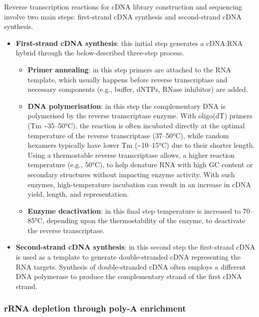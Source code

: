\documentclass[
]{book}
\begin{document}
Reverse transcription reactions for cDNA library construction and sequencing involve two main steps: first-strand cDNA synthesis and second-strand cDNA synthesis.

\begin{itemize}
\item
  \textbf{First-strand cDNA synthesis}: this initial step generates a cDNA:RNA hybrid through the below-described three-step process.

  \begin{itemize}
  \item
    \textbf{Primer annealing}: in this step primers are attached to the RNA template, which usually happens before reverse transcriptase and necessary components (e.g., buffer, dNTPs, RNase inhibitor) are added.
  \item
    \textbf{DNA polymerisation}: in this step the complementary DNA is polymerised by the reverse transcriptase enzyme. With oligo(dT) primers (Tm \textasciitilde35--50°C), the reaction is often incubated directly at the optimal temperature of the reverse transcriptase (37--50°C), while random hexamers typically have lower Tm (\textasciitilde10--15°C) due to their shorter length. Using a thermostable reverse transcriptase allows, a higher reaction temperature (e.g., 50°C), to help denature RNA with high GC content or secondary structures without impacting enzyme activity. With such enzymes, high-temperature incubation can result in an increase in cDNA yield, length, and representation.
  \item
    \textbf{Enzyme deactivation}: in this final step temperature is increased to 70--85°C, depending upon the thermostability of the enzyme, to deactivate the reverse transcriptase.
  \end{itemize}
\item
  \textbf{Second-strand cDNA synthesis}: in this second step the first-strand cDNA is used as a template to generate double-stranded cDNA representing the RNA targets. Synthesis of double-stranded cDNA often employs a different DNA polymerase to produce the complementary strand of the first cDNA strand.
\end{itemize}

\hypertarget{rrna-depletion-polya}{%
\subsubsection*{rRNA depletion through poly-A enrichment}\label{rrna-depletion-polya}}
\end{document}
